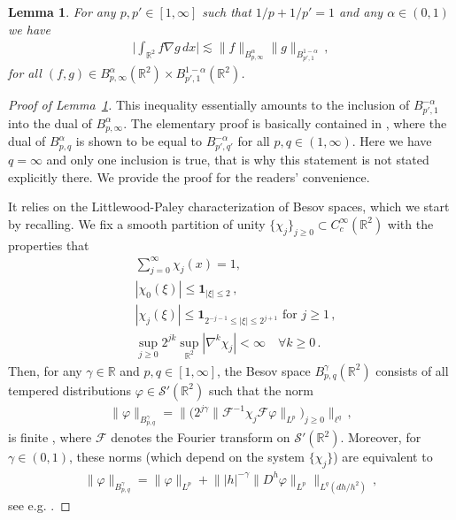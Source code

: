 \documentclass[fleqn
]{article}
\numberwithin{equation}{section}
\newcommand{\R}{{\mathbb R}}
\newtheorem{lem}[thm]{Lemma}
\theoremstyle{definition}
\begin{document}
\begin{lem}\label{l:dual_besov}
For any $p,p'\in [1,\infty]$ such that $1/p+1/p'=1$
and any $\alpha\in (0,1)$ we have
\begin{align*}
\bigg|
\int_{\R^2}f\nabla g\, dx 
\bigg|
\lesssim
\|f\|_{B^{\alpha}_{p,\infty}}\|g\|_{B^{1-\alpha}_{p',1}}\,,
\end{align*}
for all $(f,g)\in B^{\alpha}_{p,\infty}(\R^2)\times B^{1-\alpha}_{p',1}(\R^2)$.
\end{lem}
\begin{proof}[Proof of Lemma~\ref{l:dual_besov}]
This inequality essentially amounts to the inclusion of $B^{-\alpha}_{p',1}$ into the dual of $B^{\alpha}_{p,\infty}$.
The elementary proof  is basically contained in \cite[\S~2.11]{triebel83}, 
where the dual of $B^{\alpha}_{p,q}$ is shown to be equal to $B^{-\alpha}_{p',q'}$ for all $p,q\in (1,\infty)$.
Here we have $q=\infty$ and only one inclusion is true, 
that is why this statement is not stated explicitly there.
We provide the proof for the readers' convenience.

It relies on the Littlewood-Paley characterization of Besov spaces, which we start by recalling.
We fix a smooth partition of unity $\lbrace\chi_j\rbrace_{j\geq 0}\subset C_c^\infty(\R^2)$ with the properties that
\begin{align*}
&
\sum_{j=0}^\infty \chi_j(x)=1,\\
&  |\chi_0(\xi)|\leq \mathbf 1_{|\xi|\leq 2}\,,
\\
&
|\chi_j(\xi)|\leq\mathbf 1_{2^{-j-1}\leq |\xi|\leq 2^{j+1}}
\text{ for }j\geq 1\,,
\\
& \sup_{j\geq 0} 2^{jk}\sup_{\R^2}|\nabla^k\chi_j| <\infty\quad\forall k\geq 0\,.
\end{align*}
Then, for any $\gamma\in\R$ and $p,q\in [1,\infty]$, the Besov space $B^{\gamma}_{p,q}(\R^2)$ consists of all tempered distributions $\varphi \in\mathcal S'(\R^2)$ such that the norm
\begin{align*}
\|\varphi \|_{B^{\gamma}_{p,q}} =\big\| \big(2^{j\gamma}\|\mathcal F^{-1}\chi_j\mathcal F \varphi\|_{L^p}\big)_{j\geq 0}\big\|_{\ell^q}\,,
\end{align*}
is finite  \cite[\S~2.3.1]{triebel83},
where $\mathcal F$ denotes the Fourier transform on $\mathcal S'(\R^2)$.
Moreover, for $\gamma\in (0,1)$, these norms (which depend on the system $\lbrace\chi_j\rbrace$) are equivalent to 
\begin{align*}
\|\varphi \|_{B^{\gamma}_{p,q}} =
\|\varphi\|_{L^p} + \big\| |h|^{-\gamma} \|D^h\varphi\|_{L^p}\big\|_{L^q(dh/h^2)}
\,,
\end{align*}
see e.g. \cite[\S{2.5.12}]{triebel83}.


\end{proof}
\end{document}

